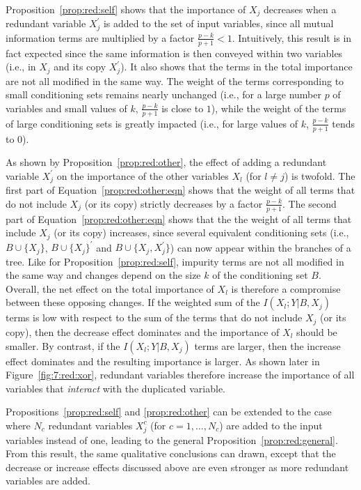 Proposition~\ref{prop:red:self} shows that the importance of $X_j$ decreases
when a redundant variable $X_j^\prime$ is added to the set of input variables,
since all mutual information terms are multiplied by a factor $\tfrac{p-k}{p+1}
< 1$. Intuitively, this result is in fact expected since the same information
is then conveyed within two variables (i.e., in $X_j$ and its copy
$X_j^\prime$). It also shows that the terms in the total importance are not all
modified in the same way. The weight of the terms corresponding to small
conditioning sets remains nearly unchanged (i.e., for a large number $p$ of
variables and small values of $k$, $\tfrac{p-k}{p+1}$ is close to $1$), while
the weight of the terms of large conditioning sets is greatly impacted (i.e.,
for large values of $k$, $\tfrac{p-k}{p+1}$ tends to $0$).

As shown by Proposition~\ref{prop:red:other}, the effect of adding a redundant
variable $X_j^\prime$ on the importance of the other variables $X_l$ (for
$l\neq j$) is twofold. The first part of Equation~\ref{prop:red:other:eqn}
shows that the weight of all terms that do not include $X_j$ (or its copy)
strictly decreases by a factor $\tfrac{p-k}{p+1}$. The second part of
Equation~\ref{prop:red:other:eqn} shows that the the weight of all terms that
include $X_j$ (or its copy) increases, since several equivalent conditioning
sets (i.e., $B\cup \{X_j\}$, $B\cup \{X_j\}^\prime$ and $B\cup \{X_j,
X_j^\prime\}$) can now appear within the branches of a tree. Like for
Proposition~\ref{prop:red:self}, impurity terms are not all modified in the
same way and changes depend on the size $k$ of the conditioning set $B$.
Overall, the net effect on the total importance of $X_l$ is therefore a
compromise between these opposing changes. If the weighted sum of the
$I(X_l;Y|B,X_j)$ terms is low with respect to the sum of the terms that do not
include $X_j$ (or its copy), then the decrease effect dominates and the
importance of $X_l$ should be smaller. By contrast, if the $I(X_l;Y|B,X_j)$
terms are larger, then the increase effect dominates and the resulting
importance is larger. As shown later in Figure~\ref{fig:7:red:xor}, redundant variables therefore
increase the importance of all variables that \textit{interact} with the duplicated variable.

Propositions~\ref{prop:red:self} and \ref{prop:red:other} can be extended to
the case where $N_c$ redundant variables $X_j^c$ (for $c=1,\dots,N_c$) are
added to the input variables instead of one, leading to the general
Proposition~\ref{prop:red:general}. From this result, the same qualitative
conclusions can drawn, except that the decrease or increase effects discussed
above are even stronger as more redundant variables are added.

